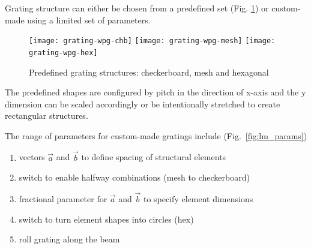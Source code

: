 \documentclass[10pt]{scrartcl}
\begin{document}
Grating structure can either be chosen from a predefined set (Fig. \ref{fig:lm_predef}) or custom-made using a limited set of parameters.
%
\begin{figure}[ht]
	\begin{center}
		\texttt{[image: grating-wpg-chb]}
		\texttt{[image: grating-wpg-mesh]}				\texttt{[image: grating-wpg-hex]}
	\end{center}
	\caption{Predefined grating structures: checkerboard, mesh and hexagonal}
	\label{fig:lm_predef}
\end{figure}
%
The predefined shapes are configured by pitch in the direction of x-axis and the y dimension can be scaled accordingly or be intentionally stretched to create rectangular structures.

The range of parameters for custom-made gratings include (Fig.~\ref{fig:lm_params})
%
\begin{enumerate}
	\item vectors $\vec{a}$ and $\vec{b}$ to define spacing of structural elements
	\item switch to enable halfway combinations (mesh to checkerboard)
	\item fractional parameter for $\vec{a}$ and $\vec{b}$ to specify element dimensions
	\item switch to turn element shapes into circles (hex)
	\item roll grating along the beam
\end{enumerate}
%
\end{document}
